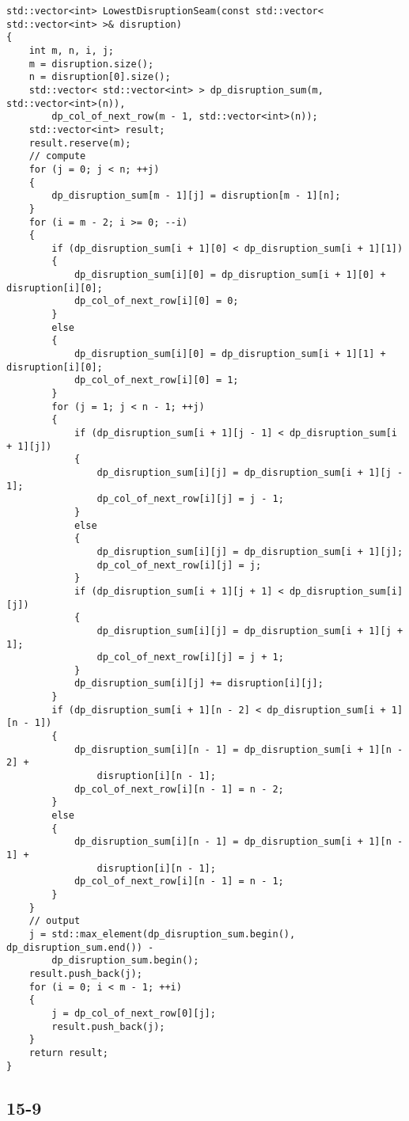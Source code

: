 \begin{verbatim}
std::vector<int> LowestDisruptionSeam(const std::vector< std::vector<int> >& disruption)
{
    int m, n, i, j;
    m = disruption.size();
    n = disruption[0].size();
    std::vector< std::vector<int> > dp_disruption_sum(m, std::vector<int>(n)), 
        dp_col_of_next_row(m - 1, std::vector<int>(n));
    std::vector<int> result;
    result.reserve(m);
    // compute
    for (j = 0; j < n; ++j)
    {
        dp_disruption_sum[m - 1][j] = disruption[m - 1][n];
    }
    for (i = m - 2; i >= 0; --i)
    {
        if (dp_disruption_sum[i + 1][0] < dp_disruption_sum[i + 1][1])
        {
            dp_disruption_sum[i][0] = dp_disruption_sum[i + 1][0] + disruption[i][0];
            dp_col_of_next_row[i][0] = 0;
        }
        else
        {
            dp_disruption_sum[i][0] = dp_disruption_sum[i + 1][1] + disruption[i][0];
            dp_col_of_next_row[i][0] = 1;
        }
        for (j = 1; j < n - 1; ++j)
        {
            if (dp_disruption_sum[i + 1][j - 1] < dp_disruption_sum[i + 1][j])
            {
                dp_disruption_sum[i][j] = dp_disruption_sum[i + 1][j - 1];
                dp_col_of_next_row[i][j] = j - 1;
            }
            else
            {
                dp_disruption_sum[i][j] = dp_disruption_sum[i + 1][j];
                dp_col_of_next_row[i][j] = j;
            }
            if (dp_disruption_sum[i + 1][j + 1] < dp_disruption_sum[i][j])
            {
                dp_disruption_sum[i][j] = dp_disruption_sum[i + 1][j + 1];
                dp_col_of_next_row[i][j] = j + 1;
            }
            dp_disruption_sum[i][j] += disruption[i][j];
        }
        if (dp_disruption_sum[i + 1][n - 2] < dp_disruption_sum[i + 1][n - 1])
        {
            dp_disruption_sum[i][n - 1] = dp_disruption_sum[i + 1][n - 2] + 
                disruption[i][n - 1];
            dp_col_of_next_row[i][n - 1] = n - 2;
        }
        else
        {
            dp_disruption_sum[i][n - 1] = dp_disruption_sum[i + 1][n - 1] + 
                disruption[i][n - 1];
            dp_col_of_next_row[i][n - 1] = n - 1;
        }
    }
    // output
    j = std::max_element(dp_disruption_sum.begin(), dp_disruption_sum.end()) - 
        dp_disruption_sum.begin();
    result.push_back(j);
    for (i = 0; i < m - 1; ++i)
    {
        j = dp_col_of_next_row[0][j];
        result.push_back(j);
    }
    return result;
}
\end{verbatim}

\subsection*{15-9}

